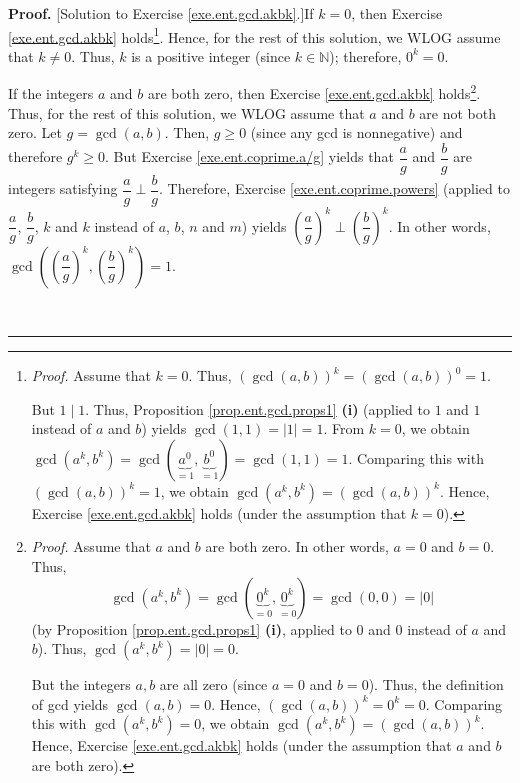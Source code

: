 \documentclass[numbers=enddot,12pt,final,onecolumn,notitlepage]{scrartcl}%
\numberwithin{exer}{subsection}
\theoremstyle{definition}
\newenvironment{fineprint}{\begin{small}}{\end{small}}
\newenvironment{proof}[1][Proof]{\noindent\textbf{#1.} }{\ \rule{0.5em}{0.5em}}
\begin{document}
\begin{fineprint}
\begin{proof}
[Solution to Exercise \ref{exe.ent.gcd.akbk}.]If $k=0$, then Exercise
\ref{exe.ent.gcd.akbk} holds\footnote{\textit{Proof.} Assume that $k=0$. Thus,
$\left(  \gcd\left(  a,b\right)  \right)  ^{k}=\left(  \gcd\left(  a,b\right)
\right)  ^{0}=1$.
\par
But $1\mid1$. Thus, Proposition \ref{prop.ent.gcd.props1} \textbf{(i)}
(applied to $1$ and $1$ instead of $a$ and $b$) yields $\gcd\left(
1,1\right)  =\left\vert 1\right\vert =1$. From $k=0$, we obtain $\gcd\left(
a^{k},b^{k}\right)  =\gcd\left(  \underbrace{a^{0}}_{=1},\underbrace{b^{0}%
}_{=1}\right)  =\gcd\left(  1,1\right)  =1$. Comparing this with $\left(
\gcd\left(  a,b\right)  \right)  ^{k}=1$, we obtain $\gcd\left(  a^{k}%
,b^{k}\right)  =\left(  \gcd\left(  a,b\right)  \right)  ^{k}$. Hence,
Exercise \ref{exe.ent.gcd.akbk} holds (under the assumption that $k=0$).}.
Hence, for the rest of this solution, we WLOG assume that $k\neq0$. Thus, $k$
is a positive integer (since $k\in\mathbb{N}$); therefore, $0^{k}=0$.

If the integers $a$ and $b$ are both zero, then Exercise
\ref{exe.ent.gcd.akbk} holds\footnote{\textit{Proof.} Assume that $a$ and $b$
are both zero. In other words, $a=0$ and $b=0$. Thus,
\[
\gcd\left(  a^{k},b^{k}\right)  =\gcd\left(  \underbrace{0^{k}}_{=0}%
,\underbrace{0^{k}}_{=0}\right)  =\gcd\left(  0,0\right)  =\left\vert
0\right\vert
\]
(by Proposition \ref{prop.ent.gcd.props1} \textbf{(i)}, applied to $0$ and $0$
instead of $a$ and $b$). Thus, $\gcd\left(  a^{k},b^{k}\right)  =\left\vert
0\right\vert =0$.
\par
But the integers $a,b$ are all zero (since $a=0$ and $b=0$). Thus, the
definition of gcd yields $\gcd\left(  a,b\right)  =0$. Hence, $\left(
\gcd\left(  a,b\right)  \right)  ^{k}=0^{k}=0$. Comparing this with
$\gcd\left(  a^{k},b^{k}\right)  =0$, we obtain $\gcd\left(  a^{k}%
,b^{k}\right)  =\left(  \gcd\left(  a,b\right)  \right)  ^{k}$. Hence,
Exercise \ref{exe.ent.gcd.akbk} holds (under the assumption that $a$ and $b$
are both zero).}. Thus, for the rest of this solution, we WLOG assume that $a$
and $b$ are not both zero. Let $g=\gcd\left(  a,b\right)  $. Then, $g\geq0$
(since any gcd is nonnegative) and therefore $g^{k}\geq0$. But Exercise
\ref{exe.ent.coprime.a/g} yields that $\dfrac{a}{g}$ and $\dfrac{b}{g}$ are
integers satisfying $\dfrac{a}{g}\perp\dfrac{b}{g}$. Therefore, Exercise
\ref{exe.ent.coprime.powers} (applied to $\dfrac{a}{g}$, $\dfrac{b}{g}$, $k$
and $k$ instead of $a$, $b$, $n$ and $m$) yields $\left(  \dfrac{a}{g}\right)
^{k}\perp\left(  \dfrac{b}{g}\right)  ^{k}$. In other words, $\gcd\left(
\left(  \dfrac{a}{g}\right)  ^{k},\left(  \dfrac{b}{g}\right)  ^{k}\right)
=1$.


\end{proof}
\end{fineprint}
\end{document}
